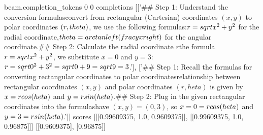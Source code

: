 beam.completion_tokens
0
0
completions
[['## Step 1: Understand the conversion formulas\nTo convert from rectangular (Cartesian) coordinates $(x, y)$ to polar coordinates $(r, \\theta)$, we use the following formulas:\n$r = \\sqrt{x^2 + y^2}$ for the radial coordinate,\n$\\theta = \\arctan\\left(\\frac{y}{x}\\right)$ for the angular coordinate.\n\n## Step 2: Calculate the radial coordinate $r$\nUsing the formula $r = \\sqrt{x^2 + y^2}$, we substitute $x = 0$ and $y = 3$:\n$r = \\sqrt{0^2 + 3^2} = \\sqrt{0 + 9} = \\sqrt{9} = 3$.\n\n'], ['## Step 1: Recall the formulas for converting rectangular coordinates to polar coordinates\nThe relationship between rectangular coordinates $(x,y)$ and polar coordinates $(r,heta)$ is given by $x = r\\cos(heta)$ and $y = r\\sin(heta)$.\n\n## Step 2: Plug in the given rectangular coordinates into the formulas\nWe have $(x,y) = (0,3)$, so $x = 0 = r\\cos(heta)$ and $y = 3 = r\\sin(heta)$.\n\n']]
scores
[[[0.99609375, 1.0, 0.9609375]], [[0.99609375, 1.0, 0.96875]]]
[[0.9609375], [0.96875]]

